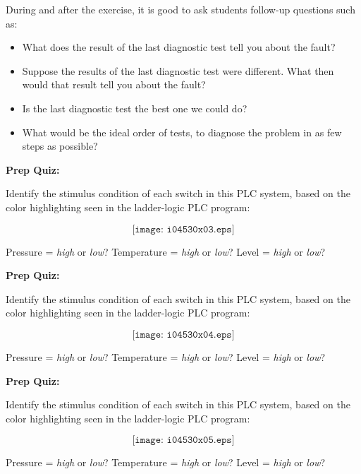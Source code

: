 During and after the exercise, it is good to ask students follow-up questions such as:

\begin{itemize}
\item{} What does the result of the last diagnostic test tell you about the fault?
\item{} Suppose the results of the last diagnostic test were different.  What then would that result tell you about the fault?
\item{} Is the last diagnostic test the best one we could do?
\item{} What would be the ideal order of tests, to diagnose the problem in as few steps as possible?
\end{itemize}










\vfil \eject

\noindent
{\bf Prep Quiz:}

Identify the stimulus condition of each switch in this PLC system, based on the color highlighting seen in the ladder-logic PLC program:

$$\texttt{[image: i04530x03.eps]}$$

Pressure = {\it high} or {\it low}? \hskip 40pt Temperature = {\it high} or {\it low}? \hskip 40pt Level = {\it high} or {\it low}?









\vfil \eject

\noindent
{\bf Prep Quiz:}

Identify the stimulus condition of each switch in this PLC system, based on the color highlighting seen in the ladder-logic PLC program:

$$\texttt{[image: i04530x04.eps]}$$

Pressure = {\it high} or {\it low}? \hskip 40pt Temperature = {\it high} or {\it low}? \hskip 40pt Level = {\it high} or {\it low}?









\vfil \eject

\noindent
{\bf Prep Quiz:}

Identify the stimulus condition of each switch in this PLC system, based on the color highlighting seen in the ladder-logic PLC program:

$$\texttt{[image: i04530x05.eps]}$$

Pressure = {\it high} or {\it low}? \hskip 40pt Temperature = {\it high} or {\it low}? \hskip 40pt Level = {\it high} or {\it low}?






